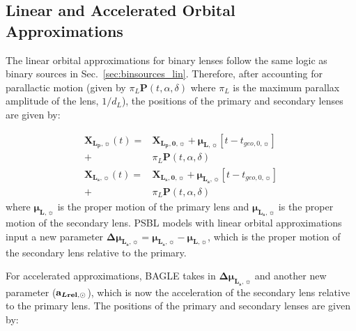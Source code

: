 \documentclass[twocolumn]{aastex701}
\newcommand{\vect}[1]{\boldsymbol{#1}}
\newcommand{\accLsec}{\bold{a}_{\boldsymbol{L\mathrm{rel}},\sun}}
\newcommand{\tnot}{t_{0,\sun}}
\newcommand{\deltamulsvec}{\vect{\Delta\mu}_{\boldsymbol{L_s},\sun}}
\newcommand{\mulvec}{\vect{\mu}_{\boldsymbol{L},\sun}}
\newcommand{\mulsvec}{\vect{\mu}_{\boldsymbol{L_s} ,\sun}}
\newcommand{\Xlpovec}{\vect{X}_{\boldsymbol{L_p,0},\sun}}
\newcommand{\Xlsovec}{\vect{X}_{\boldsymbol{L_s,0},\sun}}
\newcommand{\Xlpvec}{\vect{X}_{\boldsymbol{L_p},\sun}}
\newcommand{\Xlsvec}{\vect{X}_{\boldsymbol{L_s},\sun}}
\begin{document}
\subsection{Linear and Accelerated Orbital Approximations}
\label{sec:binlenses_lin}




The linear orbital approximations for binary lenses follow the same logic as binary sources in Sec.~\ref{sec:binsources_lin}. Therefore, after accounting for parallactic motion (given by $\pi_L
\vect{P}(t, \alpha, \delta)$ where $\pi_L$ is the
maximum parallax amplitude of the lens, $1/d_L$), the positions of the primary and secondary lenses are given by: 

\begin{eqnarray}
\label{linear_motion}
    \Xlpvec (t) =& \Xlpovec + \mulvec [t - t_{geo, 0, \sun}] \nonumber \\
    +& \pi_L \vect{P}(t, \alpha, \delta) \\
\label{linear_motion2}
    \Xlsvec (t) =& \Xlsovec + \mulsvec [t - t_{geo, 0, \sun}]   \nonumber \\
    +&  \pi_L \vect{P}(t, \alpha, \delta) 
\end{eqnarray}
%
where $\mulvec$ is the proper motion of the primary lens and $\mulsvec$ is the proper motion of the secondary lens. PSBL models with linear orbital approximations input a new parameter $\deltamulsvec = \mulsvec - \mulvec$, which is the proper motion of the secondary lens relative to the primary.

For accelerated approximations, BAGLE takes in $\deltamulsvec$ and another new parameter  ($\accLsec$), which is now the acceleration of the secondary lens relative to the primary lens. The positions of the primary and secondary lenses are given by: 
\end{document}
